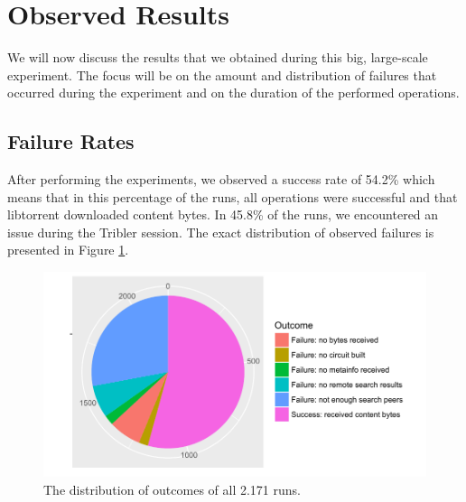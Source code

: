 \section{Observed Results}
We will now discuss the results that we obtained during this big, large-scale experiment. The focus will be on the amount and distribution of failures that occurred during the experiment and on the duration of the performed operations.

\subsection{Failure Rates}
After performing the experiments, we observed a success rate of 54.2\% which means that in this percentage of the runs, all operations were successful and that libtorrent downloaded content bytes. In 45.8\% of the runs, we encountered an issue during the Tribler session. The exact distribution of observed failures is presented in Figure \ref{fig:big-experiment-outcome-pie}.

\begin{figure}[!h]
	\centering
	\includegraphics[width=0.7\columnwidth]{images/big_experiment/outcome_pie}
	\caption{The distribution of outcomes of all 2.171 runs.}
	\label{fig:big-experiment-outcome-pie}
\end{figure}

